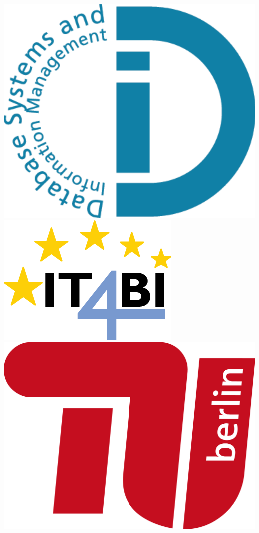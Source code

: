 \documentclass[11pt, a4paper, oneside]{Thesis} %
\begin{document}
\begin{titlepage}
\begin{center}

\includegraphics[height=0.13\textheight]{./Figures/logo_dima.pdf}
\hfill
\includegraphics[height=0.15\textheight]{./Figures/logo_it4bi.png}
\hfill
\includegraphics[height=0.13\textheight]{./Figures/logo_tub.png}



\end{center}
\end{titlepage}
\end{document}
